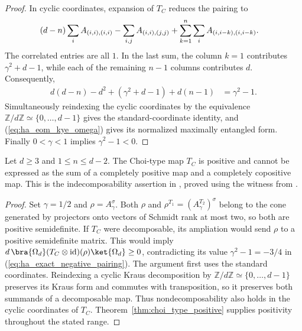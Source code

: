 \begin{proof}
    \leanok
    In cyclic coordinates, expansion of $T_C$ reduces the pairing to
    \begin{align}
        &(d-n)\sum_i A_{(i,i),(i,i)}
        -\sum_{i,j}A_{(i,i),(j,j)}
        +\sum_{k=1}^{n}\sum_i A_{(i,i-k),(i,i-k)}. \notag
    \end{align}
    The correlated entries are all $1$. In the last sum, the column $k=1$
    contributes $\gamma^2+d-1$, while each of the remaining $n-1$ columns
    contributes $d$. Consequently,
    \begin{align}
        d(d-n)-d^2+(\gamma^2+d-1)+d(n-1)
         &=\gamma^2-1.
    \end{align}
    Simultaneously reindexing the cyclic coordinates by the equivalence
    $\mathbb Z/d\mathbb Z\simeq\{0,\ldots,d-1\}$ gives the standard-coordinate
    identity, and (\ref{eq:ha_eom_kye_omega}) gives its normalized maximally
    entangled form.
    Finally $0<\gamma<1$ implies $\gamma^2-1<0$.
\end{proof}

\begin{theorem}
    \label{thm:choi_type_indecomposable}
    \leanok
    Let $d\ge3$ and $1\le n\le d-2$. The Choi-type map $T_C$ is positive
    and cannot be expressed as the sum of a completely positive map and a
    completely copositive map. This is the indecomposability assertion in
    \cite[Example~3.1, Equation~(3.20)]{Wolf2012Quantum}, proved using the
    witness from \cite[Theorem~2.1, pp.~593--595]{Ha1998AtomicPositiveMaps}.
\end{theorem}

\begin{proof}
    \leanok
    Set $\gamma=1/2$ and $\rho=A_\gamma^\sigma$. Both $\rho$ and
    $\rho^{T_1}=(A_\gamma^{T_2})^\sigma$ belong to the cone generated by
    projectors onto vectors of Schmidt rank at most two, so both are positive
    semidefinite. If $T_C$ were decomposable, its ampliation would send
    $\rho$ to a positive semidefinite matrix. This would imply
    $d\,\bra{\Omega_d}(T_C\otimes\operatorname{id})(\rho)\ket{\Omega_d}\ge0$,
    contradicting its value $\gamma^2-1=-3/4$ in
    (\ref{eq:ha_exact_negative_pairing}).
    The argument first uses the standard coordinates. Reindexing a cyclic
    Kraus decomposition by $\mathbb Z/d\mathbb Z\simeq\{0,\ldots,d-1\}$
    preserves its Kraus form and commutes with transposition, so it preserves
    both summands of a decomposable map. Thus nondecomposability also holds
    in the cyclic coordinates of $T_C$. Theorem~\ref{thm:choi_type_positive}
    supplies positivity throughout the stated range.
\end{proof}

